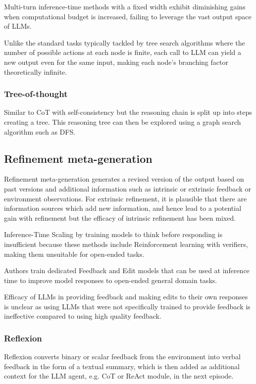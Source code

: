 Multi-turn inference-time methods with a fixed width exhibit diminishing gains when computational budget is increased, failing to leverage the vast output space of LLMs.\cite{misaki2025widerdeeperscalingllm} 

Unlike the standard tasks typically tackled by tree search algorithms where the number of possible actions at each node is finite, each call to LLM can yield a new output even for the same input, making each node’s branching factor theoretically infinite.\cite{misaki2025widerdeeperscalingllm} 


\subsubsection{Tree-of-thought}
Similar to CoT with self-consistency but the reasoning chain is split up into steps creating a tree. This reasoning tree can then be explored using a graph search algorithm such as DFS.


\subsection{Refinement meta-generation}
Refinement meta-generation generates a revised version of the output based on past versions and additional information such as intrinsic or extrinsic feedback or environment observations. \cite{welleck2024decodingmetagenerationinferencetimealgorithms}
For extrinsic refinement, it is plausible that there are information sources which add new information, and hence lead to a potential gain with refinement but the efficacy of intrinsic refinement has been mixed. \cite{welleck2024decodingmetagenerationinferencetimealgorithms}


Inference-Time Scaling by training models to think before responding is insufficient because these methods include Reinforcement learning with verifiers, making them unsuitable for open-ended tasks. \cite{wang2025dedicatedfeedbackeditmodels}

Authors train dedicated Feedback and Edit models that can be used at inference time to improve model responses to open-ended general domain tasks. \cite{wang2025dedicatedfeedbackeditmodels}

Efficacy of LLMs in providing feedback and making edits to their own responses is unclear as using LLMs that were not specifically trained to provide feedback is ineffective compared to using high quality feedback. \cite{wang2025dedicatedfeedbackeditmodels}


\subsubsection{Reflexion}
Reflexion converts binary or scalar feedback from the environment into verbal feedback in the form 
of a textual summary, which is then added as additional context for the LLM agent, e.g. CoT or ReAct module, in the next episode. \cite{shinn2023reflexionlanguageagentsverbal}

